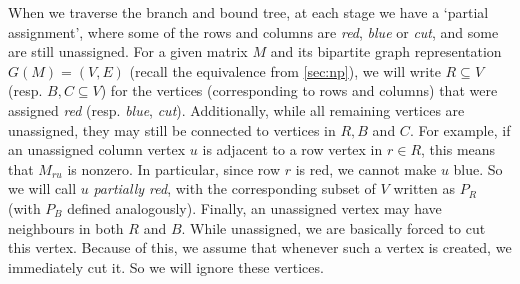 	When we traverse the branch and bound tree, at each stage we have a
	`partial assignment', where some of the rows and columns are
	\textit{red}, \textit{blue} or \textit{cut}, and some are still
	unassigned. For a given matrix $M$ and its bipartite graph representation
	$G(M) = (V, E)$ (recall the equivalence from \autoref{sec:np}),
	we will write $R \subseteq V$ (resp. $B, C \subseteq V$)
	for the vertices (corresponding to rows and columns) that were assigned
	\textit{red} (resp. \textit{blue}, \textit{cut}). Additionally, while
	all remaining vertices are unassigned, they may still be connected to
	vertices in $R, B$ and $C$. For example, if an unassigned column
	vertex $u$ is
	adjacent to a row vertex in $r \in R$, this means that $M_{ru}$ is nonzero.
	In particular, since row $r$ is red, we cannot make $u$ blue. So we will
	call $u$ \textit{partially red}, with the corresponding subset of $V$
	written as $P_R$ (with $P_B$ defined
	analogously). Finally, an unassigned vertex may have neighbours in both
	$R$ and $B$. While unassigned, we are basically forced to cut this vertex.
	Because of this, we assume that whenever such a vertex is created, we
	immediately cut it. So we will ignore these vertices.

